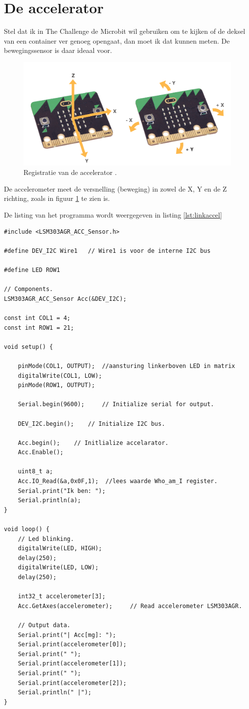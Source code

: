 \section{De accelerator}
Stel dat ik in The Challenge de Microbit wil gebruiken om te kijken of de deksel van een container ver genoeg opengaat, dan moet ik dat kunnen meten. De bewegingssensor is daar ideaal voor.
\begin{figure}[h!]
	\captionsetup{justification=centering}
	\includegraphics[width=0.35 \linewidth]{figuren/microbit_axes}
	\centering
	\caption{Registratie van de accelerator \cite{microbitAccel}.}
	\label{fig:accel}
\end{figure}
De accelerometer meet de versnelling (beweging) in zowel de X, Y en de Z richting, zoals in figuur \ref{fig:accel} te zien is.

\newpage
De listing van het programma wordt weergegeven in listing \ref{lst:linkaccel}
\begin{lstlisting}[caption={Uitlezen van de accelarator},label={lst:linkaccel}]
#include <LSM303AGR_ACC_Sensor.h>

#define DEV_I2C Wire1   // Wire1 is voor de interne I2C bus 

#define LED ROW1 

// Components.
LSM303AGR_ACC_Sensor Acc(&DEV_I2C);

const int COL1 = 4;   
const int ROW1 = 21;   

void setup() {
	
	pinMode(COL1, OUTPUT);  //aansturing linkerboven LED in matrix
	digitalWrite(COL1, LOW);
	pinMode(ROW1, OUTPUT);
	
	Serial.begin(9600);  	// Initialize serial for output.
	
	DEV_I2C.begin();   	// Initialize I2C bus.
	
	Acc.begin();  	// Initlialize accelarator.
	Acc.Enable();

	uint8_t a;
	Acc.IO_Read(&a,0x0F,1);  //lees waarde Who_am_I register.
	Serial.print("Ik ben: ");
	Serial.println(a);
}

void loop() {
	// Led blinking.
	digitalWrite(LED, HIGH);
	delay(250);
	digitalWrite(LED, LOW);
	delay(250);
	
	int32_t accelerometer[3];
	Acc.GetAxes(accelerometer); 	// Read accelerometer LSM303AGR.
	
	// Output data.
	Serial.print("| Acc[mg]: ");
	Serial.print(accelerometer[0]);
	Serial.print(" ");
	Serial.print(accelerometer[1]);
	Serial.print(" ");
	Serial.print(accelerometer[2]);
	Serial.println(" |");
}
\end{lstlisting}

